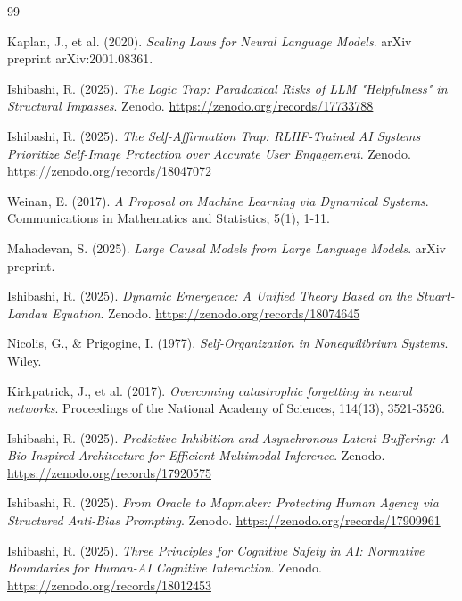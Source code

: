 \documentclass[twocolumn, 10pt, a4paper]{article}
\begin{document}
\begin{thebibliography}{99}

Kaplan, J., et al. (2020). \textit{Scaling Laws for Neural Language Models}. arXiv preprint arXiv:2001.08361.

Ishibashi, R. (2025). \textit{The Logic Trap: Paradoxical Risks of LLM "Helpfulness" in Structural Impasses}. Zenodo. \url{https://zenodo.org/records/17733788}

Ishibashi, R. (2025). \textit{The Self-Affirmation Trap: RLHF-Trained AI Systems Prioritize Self-Image Protection over Accurate User Engagement}. Zenodo. \url{https://zenodo.org/records/18047072}

Weinan, E. (2017). \textit{A Proposal on Machine Learning via Dynamical Systems}. Communications in Mathematics and Statistics, 5(1), 1-11.

Mahadevan, S. (2025). \textit{Large Causal Models from Large Language Models}. arXiv preprint.

Ishibashi, R. (2025). \textit{Dynamic Emergence: A Unified Theory Based on the Stuart-Landau Equation}. Zenodo. \url{https://zenodo.org/records/18074645}

Nicolis, G., \& Prigogine, I. (1977). \textit{Self-Organization in Nonequilibrium Systems}. Wiley.

Kirkpatrick, J., et al. (2017). \textit{Overcoming catastrophic forgetting in neural networks}. Proceedings of the National Academy of Sciences, 114(13), 3521-3526.

Ishibashi, R. (2025). \textit{Predictive Inhibition and Asynchronous Latent Buffering: A Bio-Inspired Architecture for Efficient Multimodal Inference}. Zenodo. \url{https://zenodo.org/records/17920575}

Ishibashi, R. (2025). \textit{From Oracle to Mapmaker: Protecting Human Agency via Structured Anti-Bias Prompting}. Zenodo. \url{https://zenodo.org/records/17909961}

Ishibashi, R. (2025). \textit{Three Principles for Cognitive Safety in AI: Normative Boundaries for Human-AI Cognitive Interaction}. Zenodo. \url{https://zenodo.org/records/18012453}

\end{thebibliography}
\end{document}
